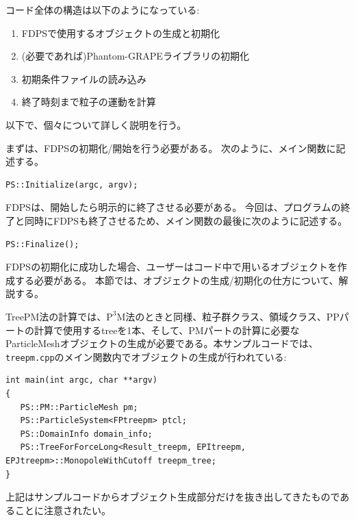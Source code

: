 コード全体の構造は以下のようになっている:
\begin{enumerate}[leftmargin=*,itemsep=-1ex,label=(\arabic*)]
\item FDPSで使用するオブジェクトの生成と初期化
\item (必要であれば)Phantom-GRAPEライブラリの初期化
\item 初期条件ファイルの読み込み
\item 終了時刻まで粒子の運動を計算
\end{enumerate}

以下で、個々について詳しく説明を行う。

まずは、FDPSの初期化/開始を行う必要がある。
次のように、メイン関数に記述する。
\begin{lstlisting}[caption=FDPSの開始]
PS::Initialize(argc, argv);
\end{lstlisting}

FDPSは、開始したら明示的に終了させる必要がある。
今回は、プログラムの終了と同時にFDPSも終了させるため、メイン関数の最後に次のように記述する。
\begin{lstlisting}[caption=FDPSの終了]
PS::Finalize();
\end{lstlisting}

FDPSの初期化に成功した場合、ユーザーはコード中で用いるオブジェクトを作成する必要がある。
本節では、オブジェクトの生成/初期化の仕方について、解説する。

TreePM法の計算では、$\mathrm{P^{3}M}$法のときと同様、粒子群クラス、領域クラス、PPパートの計算で使用するtreeを1本、そして、PMパートの計算に必要なParticleMeshオブジェクトの生成が必要である。本サンプルコードでは、\texttt{treepm.cpp}のメイン関数内でオブジェクトの生成が行われている:
\begin{lstlisting}[caption=オブジェクトの生成]
int main(int argc, char **argv)
{
   PS::PM::ParticleMesh pm;
   PS::ParticleSystem<FPtreepm> ptcl;
   PS::DomainInfo domain_info;
   PS::TreeForForceLong<Result_treepm, EPItreepm, EPJtreepm>::MonopoleWithCutoff treepm_tree;
}
\end{lstlisting}
上記はサンプルコードからオブジェクト生成部分だけを抜き出してきたものであることに注意されたい。

